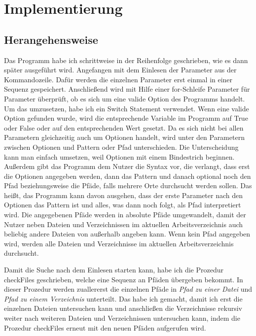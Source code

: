 \documentclass[11pt]{report}
\begin{document}
\chapter{Implementierung}
\section{Herangehensweise}
Das Programm habe ich schrittweise in der Reihenfolge geschrieben, wie es dann später ausgeführt wird. Angefangen mit dem Einlesen der Parameter aus der Kommandozeile. Dafür werden die einzelnen Parameter erst einmal in einer Sequenz gespeichert. Anschließend wird mit Hilfe einer for-Schleife Parameter für Parameter überprüft, ob es sich um eine valide Option des Programms handelt. Um das umzusetzen, habe ich ein Switch Statement verwendet. Wenn eine valide Option gefunden wurde, wird die entsprechende Variable im Programm auf True oder False oder auf den entsprechenden Wert gesetzt. Da es sich nicht bei allen Parametern gleichzeitig auch um Optionen handelt, wird unter den Parametern zwischen Optionen und Pattern oder Pfad unterschieden. Die Unterscheidung kann man einfach umsetzen, weil Optionen mit einem Bindestrich beginnen. Außerdem gibt das Programm dem Nutzer die Syntax vor, die verlangt, dass erst die Optionen angegeben werden, dann das Pattern und danach optional noch den Pfad beziehungsweise die Pfäde, falls mehrere Orte durchsucht werden sollen.
Das heißt, das Programm kann davon ausgehen, dass der erste Parameter nach den Optionen das Pattern ist und alles, was dann noch folgt, als Pfad interpretiert wird. Die angegebenen Pfäde werden in absolute Pfäde umgewandelt, damit der Nutzer neben Dateien und Verzeichnissen im aktuellen Arbeitsverzeichnis auch beliebig andere Dateien von außerhalb angeben kann. Wenn kein Pfad angegeben wird, werden alle Dateien und Verzeichnisse im aktuellen Arbeitsverzeichnis durchsucht.

Damit die Suche nach dem Einlesen starten kann, habe ich die Prozedur checkFiles geschrieben, welche eine Sequenz an Pfäden übergeben bekommt. In dieser Prozedur werden zuallererst die einzelnen Pfäde in \emph{Pfad zu einer Datei} und \emph{Pfad zu einem Verzeichnis} unterteilt. Das habe ich gemacht, damit ich erst die einzelnen Dateien untersuchen kann und anschließen die Verzeichnisse rekursiv weiter nach weiteren Dateien und Verzeichnissen untersuchen kann, indem die Prozedur checkFiles erneut mit den neuen Pfäden aufgerufen wird.
\end{document}

